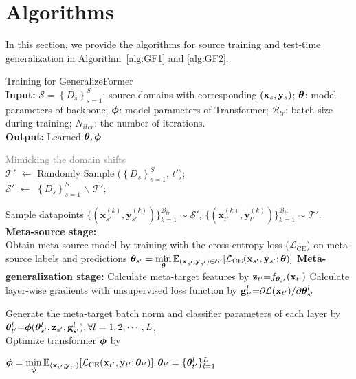 

    
\section{Algorithms}
\label{alg:generalizeformer}
In this section, we provide the algorithms for source training and test-time generalization in Algorithm~\ref{alg:GF1} and \ref{alg:GF2}. 

\begin{algorithm}[ht!]
\small
\caption{Training for GeneralizeFormer \\
{\textbf{Input:}} $\mathcal{S}=\left \{ D_{s} \right \}^{S}_{s=1}$: source domains with corresponding ${(\mathbf{x}_s, \mathbf{y}_s})$; $\boldsymbol{\theta}$: model parameters of backbone; $\boldsymbol{\phi}$: model parameters of Transformer;
$\mathcal{B}_{tr}$: batch size during training; 
$N_{iter}$: the number of iterations. \\
{\textbf{Output:}}
Learned $\boldsymbol{\theta}, \boldsymbol{\phi}$
}
\label{alg:GF1}
\begin{algorithmic}[1]
\STATE \textcolor{gray}{{Mimicking the domain shifts}} \\ $\mathcal{T'}$ $\leftarrow$ Randomly Sample ($\left \{ D_{s} \right \}^{S}_{s=1}$, $t'$); 
\\
$\mathcal{S'}$ $\leftarrow$ $\left \{ D_{s} \right \}^{S}_{s=1}$ $\backslash$ $\mathcal{T'}$; 

\STATE Sample datapoints $\{(\mathbf{x}_{s'}^{(k)}, \mathbf{y}_{s'}^{(k)})\}_{k=1}^{\mathcal{B}_{tr}} \sim \mathcal{S'}$, $\{(\mathbf{x}_{t'}^{(k)}, \mathbf{y}_{t'}^{(k)})\}_{k=1}^{\mathcal{B}_{tr}} \sim \mathcal{T'}$.
\STATE \textbf{Meta-source stage:} 
\\
\STATE 
Obtain meta-source model by training with the cross-entropy loss ($\mathcal{L}_{\mathrm{CE}}$) on meta-source labels and predictions 
$\boldsymbol{\theta}_{s'} = \mathop{\min}\limits_{\boldsymbol{\theta}} \mathbb{E}_{(\mathbf{x}_{s'}, \mathbf{y}_{s'}) \in \mathcal{S}'} [\mathcal{L}_{\mathrm{CE}}(\mathbf{x}_{s'}, \mathbf{y}_{s'}; \boldsymbol{\theta})]$
\STATE \textbf{Meta-generalization stage:} 
\STATE Calculate meta-target features by $\mathbf{z}_{t'} {=} f_{\boldsymbol{\theta}_{s'}}(\mathbf{x}_{t'})$
\STATE Calculate layer-wise gradients with unsupervised loss function by $\mathbf{g}_{t'}^l {=} {\partial \mathcal{L} (\mathbf{x}_{t'})} / {\partial \boldsymbol{\theta}^l_{s'}}$


\STATE Generate the meta-target batch norm and classifier parameters of each layer by \\
$\boldsymbol{\theta}^l_{t'} {=} \boldsymbol{\phi}(\boldsymbol{\theta}^l_{s'}, \mathbf{z}_{s'}, \mathbf{g}_{s'}^l), \forall l=1,2,\cdots, L$, \\



\STATE Optimize transformer $\boldsymbol{\phi}$ by 

$\boldsymbol{\phi} = \mathop{\min}\limits_{\boldsymbol{\phi}}  \mathbb{E}_{(\mathbf{x}_{t'}, \mathbf{y}_{t'})}[\mathcal{L}_{\mathrm{CE}}(\mathbf{x}_{t'}, \mathbf{y}_{t'};\boldsymbol{\theta}_{t'})], \boldsymbol{\theta}_{t'} = \{ \boldsymbol{\theta}^l_{t'} \}_{l=1}^L$

\ENDFOR
\end{algorithmic}
\end{algorithm}



